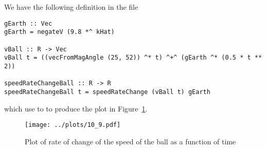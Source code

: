 
We have the following definition in the file 
\scriptsize\begin{verbatim}
gEarth :: Vec
gEarth = negateV (9.8 *^ kHat)

vBall :: R -> Vec
vBall t = ((vecFromMagAngle (25, 52)) ^* t) ^+^ (gEarth ^* (0.5 * t ** 2))

speedRateChangeBall :: R -> R
speedRateChangeBall t = speedRateChange (vBall t) gEarth
\end{verbatim}\normalsize
which use to to produce the plot in Figure~\ref{fig10_9}.

\begin{figure}[!ht]
    \texttt{[image: ../plots/10\_9.pdf]}
    \caption{Plot of rate of change of the speed of the ball as a function of time
        \label{fig10_9}} 
\end{figure}

